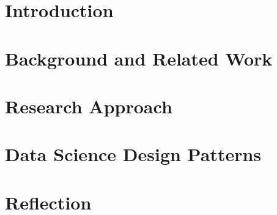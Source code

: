 \documentclass[reqno,12pt,oneside,dvipsnames,svgnames,table,x11names]{report} %
\begin{document}
 \chapter{Introduction}
   \label{chap:Intro-Chap1}
   

 \chapter{Background and Related Work}
   \label{chap:KeyTerms}
   

 \chapter{Research Approach}
   \label{chap:Method}
   

 \chapter{Data Science Design Patterns}
   \label{chap:DSDP}
   

 \chapter{Reflection}
   \label{chap:summary}
   

\startappendices
{}
\label{app:figures}


\label{app:tables}


\startbibliography
 \begin{singlespace}
  \renewcommand*{\UrlFont}{\rmfamily}
  \printbibliography[title={REFERENCES}]
 \end{singlespace}
\end{document}
